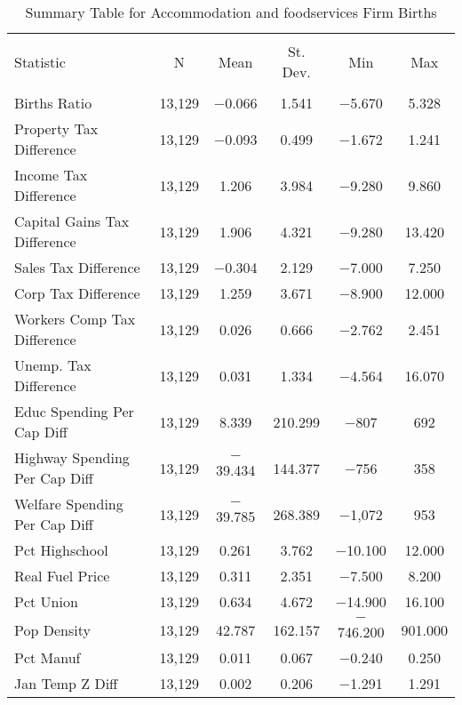 
\begin{table}[!htbp] \centering 
  \caption{Summary Table for  Accommodation and foodservices Firm Births} 
  \label{72summary} 
\begin{tabular}{@{\extracolsep{5pt}}lccccc} 
\\[-1.8ex]\hline 
\hline \\[-1.8ex] 
Statistic & \multicolumn{1}{c}{N} & \multicolumn{1}{c}{Mean} & \multicolumn{1}{c}{St. Dev.} & \multicolumn{1}{c}{Min} & \multicolumn{1}{c}{Max} \\ 
\hline \\[-1.8ex] 
Births Ratio & 13,129 & $-$0.066 & 1.541 & $-$5.670 & 5.328 \\ 
Property Tax Difference & 13,129 & $-$0.093 & 0.499 & $-$1.672 & 1.241 \\ 
Income Tax Difference & 13,129 & 1.206 & 3.984 & $-$9.280 & 9.860 \\ 
Capital Gains Tax Difference & 13,129 & 1.906 & 4.321 & $-$9.280 & 13.420 \\ 
Sales Tax Difference & 13,129 & $-$0.304 & 2.129 & $-$7.000 & 7.250 \\ 
Corp Tax Difference & 13,129 & 1.259 & 3.671 & $-$8.900 & 12.000 \\ 
Workers Comp Tax Difference & 13,129 & 0.026 & 0.666 & $-$2.762 & 2.451 \\ 
Unemp. Tax Difference & 13,129 & 0.031 & 1.334 & $-$4.564 & 16.070 \\ 
Educ Spending Per Cap Diff & 13,129 & 8.339 & 210.299 & $-$807 & 692 \\ 
Highway Spending Per Cap Diff & 13,129 & $-$39.434 & 144.377 & $-$756 & 358 \\ 
Welfare Spending Per Cap Diff & 13,129 & $-$39.785 & 268.389 & $-$1,072 & 953 \\ 
Pct Highschool & 13,129 & 0.261 & 3.762 & $-$10.100 & 12.000 \\ 
Real Fuel Price & 13,129 & 0.311 & 2.351 & $-$7.500 & 8.200 \\ 
Pct Union & 13,129 & 0.634 & 4.672 & $-$14.900 & 16.100 \\ 
Pop Density & 13,129 & 42.787 & 162.157 & $-$746.200 & 901.000 \\ 
Pct Manuf & 13,129 & 0.011 & 0.067 & $-$0.240 & 0.250 \\ 
Jan Temp Z Diff & 13,129 & 0.002 & 0.206 & $-$1.291 & 1.291 \\ 

\end{tabular}
\end{table}
